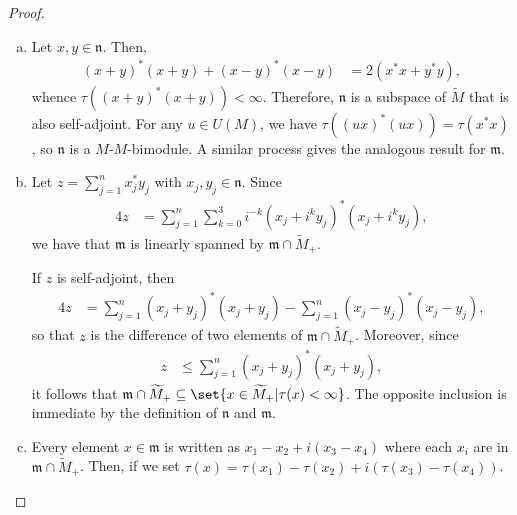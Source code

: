 \documentclass[10pt]{mypackage}
\begin{document}
\begin{proof}\hfill
  \begin{enumerate}[(a)]
    \item Let $x,y\in \mathfrak{n}$. Then,
      \begin{align*}
        \left( x+y \right)^{\ast}\left( x+y \right) + \left( x-y \right)^{\ast}\left( x-y \right) &= 2\left( x^{\ast}x + y^{\ast}y \right),
      \end{align*}
      whence $\tau\left( \left( x+y \right)^{\ast}\left( x+y \right) \right) < \infty$. Therefore, $ \mathfrak{n} $ is a subspace of $ \widetilde{M} $ that is also self-adjoint. For any $u\in U(M)$, we have $\tau\left( \left( ux \right)^{\ast}\left( ux \right) \right) = \tau\left( x^{\ast}x \right)$, so $ \mathfrak{n} $ is a $M$-$M$-bimodule. A similar process gives the analogous result for $ \mathfrak{m} $.
    \item Let $z = \sum_{j=1}^{n}x_j^{\ast}y_j$ with $x_j,y_j\in \mathfrak{n}$. Since
      \begin{align*}
        4z &= \sum_{j=1}^{n}\sum_{k=0}^{3} i^{-k}\left( x_j + i^{k}y_j \right)^{\ast}\left( x_j + i^{k}y_j \right),
      \end{align*}
      we have that $ \mathfrak{m} $ is linearly spanned by $ \mathfrak{m}\cap \widetilde{M}_{+} $.

      If $z$ is self-adjoint, then
      \begin{align*}
        4z &= \sum_{j=1}^{n}\left( x_j + y_j \right)^{\ast}\left( x_j + y_j \right) - \sum_{j=1}^{n} \left( x_j-y_j \right)^{\ast}\left( x_j - y_j \right),
      \end{align*}
      so that $z$ is the difference of two elements of $ \mathfrak{m}\cap \widetilde{M}_{+} $. Moreover, since
      \begin{align*}
        z &\leq \sum_{j=1}^{n} \left( x_j + y_j \right)^{\ast}\left( x_j + y_j \right),
      \end{align*}
      it follows that $ \mathfrak{m}\cap \widetilde{M}_{+}\subseteq \set{x\in \widetilde{M}_{+} | \tau(x) < \infty} $. The opposite inclusion is immediate by the definition of $ \mathfrak{n} $ and $ \mathfrak{m} $.
    \item Every element $x\in \mathfrak{m}$ is written as $ x_1 - x_2 + i\left( x_3 - x_4 \right) $ where each $x_i$ are in $ \mathfrak{m}\cap \widetilde{M}_{+} $. Then, if we set $\tau\left( x \right) = \tau\left( x_1 \right) - \tau\left( x_2 \right) + i\left( \tau\left( x_3 \right) - \tau\left( x_4 \right) \right)$.


\end{enumerate}
\end{proof}
\end{document}
